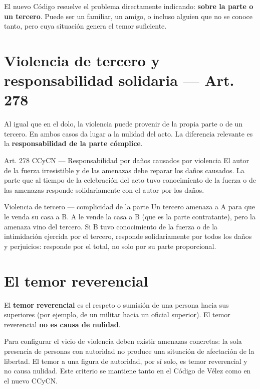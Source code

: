 \documentclass[12pt,oneside]{book}
\begin{document}
El nuevo Código resuelve el problema directamente indicando: \textbf{sobre la parte o un tercero}. Puede ser un familiar, un amigo, o incluso alguien que no se conoce tanto, pero cuya situación genera el temor suficiente.

\section{Violencia de tercero y responsabilidad solidaria --- Art. 278}

Al igual que en el dolo, la violencia puede provenir de la propia parte o de un tercero. En ambos casos da lugar a la nulidad del acto. La diferencia relevante es la \textbf{responsabilidad de la parte cómplice}.

\begin{articulo}{Art. 278 CCyCN --- Responsabilidad por daños causados por violencia}
El autor de la fuerza irresistible y de las amenazas debe reparar los daños causados. La parte que al tiempo de la celebración del acto tuvo conocimiento de la fuerza o de las amenazas responde solidariamente con el autor por los daños.
\end{articulo}

\begin{example}{Violencia de tercero --- complicidad de la parte}
Un tercero amenaza a A para que le venda su casa a B. A le vende la casa a B (que es la parte contratante), pero la amenaza vino del tercero. Si B tuvo conocimiento de la fuerza o de la intimidación ejercida por el tercero, responde solidariamente por todos los daños y perjuicios: responde por el total, no solo por su parte proporcional.
\end{example}

\section{El temor reverencial}

El \textbf{temor reverencial} es el respeto o sumisión de una persona hacia sus superiores (por ejemplo, de un militar hacia un oficial superior). El temor reverencial \textbf{no es causa de nulidad}.

Para configurar el vicio de violencia deben existir amenazas concretas: la sola presencia de personas con autoridad no produce una situación de afectación de la libertad. El temor a una figura de autoridad, por sí solo, es temor reverencial y no causa nulidad. Este criterio se mantiene tanto en el Código de Vélez como en el nuevo CCyCN.
\end{document}
